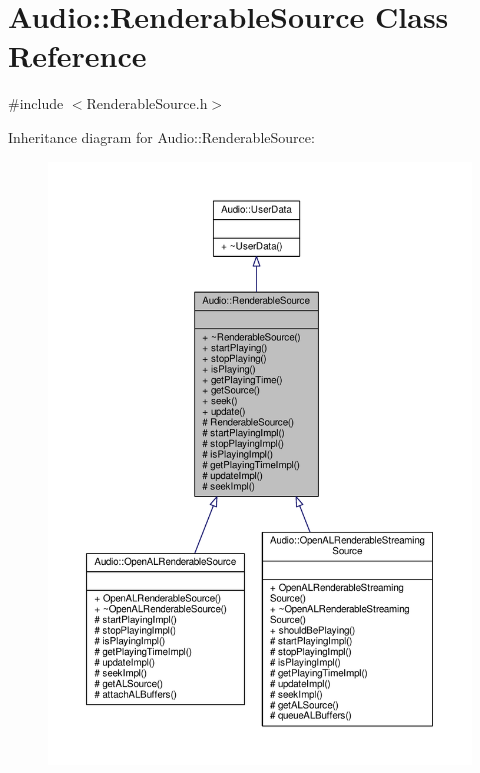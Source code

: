 \hypertarget{classAudio_1_1RenderableSource}{}\section{Audio\+:\+:Renderable\+Source Class Reference}
\label{classAudio_1_1RenderableSource}


{\ttfamily \#include $<$Renderable\+Source.\+h$>$}



Inheritance diagram for Audio\+:\+:Renderable\+Source\+:
\nopagebreak
\begin{figure}[H]
\begin{center}
\leavevmode
\includegraphics[width=350pt]{d0/dfa/classAudio_1_1RenderableSource__inherit__graph}
\end{center}
\end{figure}


